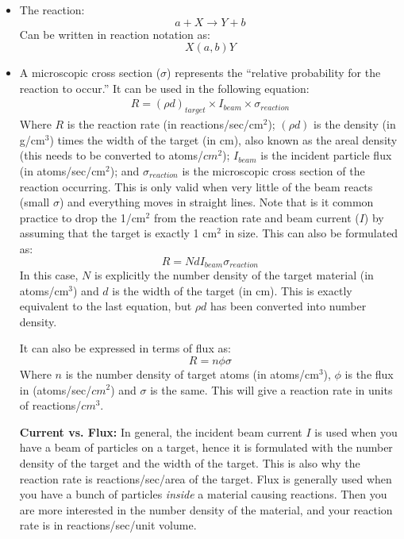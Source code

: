 \documentclass[letter]{article}
\begin{document}
\begin{itemize}
\item The reaction:
  \begin{equation*}
    a + X \to Y + b
  \end{equation*}
Can be written in reaction notation as:
\begin{equation*}
  X(a,b)Y
\end{equation*}
\cite[pp. 378-379]{krane}
\item A microscopic cross section ($\sigma$) represents the ``relative
  probability for the reaction to occur.'' It can be used in the
  following equation:
  \begin{equation*}
    \begin{split}
      R= (\rho{}d)_{target}\times{}I_{beam}\times\sigma_{reaction}
    \end{split}
  \end{equation*}
Where $R$ is the reaction rate (in reactions/sec/cm$^2$); $(\rho{}d)$ is the
density (in g/cm$^3$) times the width of the target (in cm), also
known as the areal density (this needs to be converted to atoms/$cm^2$); $I_{beam}$ is the incident particle flux
(in atoms/sec/cm$^2$); and $\sigma_{reaction}$ is the microscopic cross
section of the reaction occurring. This is only valid when very little
of the beam reacts (small $\sigma$) and everything moves in straight
lines. Note that is it common practice to drop the 1/cm$^2$ from the
reaction rate and beam current ($I$) by assuming that the target is
exactly 1 cm$^2$ in size. This can also be formulated as:
\begin{equation*}
  R = NdI_{beam}\sigma_{reaction}
\end{equation*}
In this case, $N$ is explicitly the number density of the target
material (in atoms/cm$^3$) and $d$ is the width of the target (in
cm). This is exactly equivalent to the last equation, but $\rho{}d$
has been converted into number density.

\vspace{10pt}
It can also be expressed in terms of flux as:
\begin{equation*}
        R= n\phi\sigma
\end{equation*}
Where $n$ is the number density of target atoms (in atoms/cm$^3$), $\phi$ is the flux in
(atoms/sec/$cm^2$) and $\sigma$ is the same. This will give a reaction
rate in units of reactions/$cm^3$.~\cite[Lec. 25]{lecture}
\begin{framed}
  \textbf{Current vs. Flux:} In general, the incident beam current $I$
  is used when you have a beam of particles on a target, hence it is
  formulated with the number density of the target and the width of
  the target. This is also why the reaction rate is reactions/sec/area
  of the target. Flux is generally used when you have a bunch of
  particles \textit{inside} a material causing reactions. Then you are
  more interested in the number density of the material, and your
  reaction rate is in reactions/sec/unit volume.


\end{framed}
\end{itemize}
\end{document}
